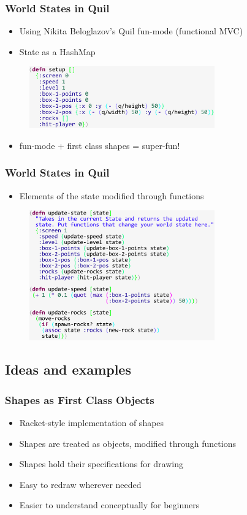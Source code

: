 \documentclass{beamer}
\begin{document}
\begin{frame}
\frametitle{World States in Quil}
	\begin{itemize}
		\item  Using Nikita Beloglazov's  Quil fun-mode (functional MVC)
		\item State as a HashMap
	\end{itemize}
	\begin{figure}
		\includegraphics[width=8cm]{PresentationImages/setupCode.pdf}
	\end{figure}
	\begin{itemize}
		\item fun-mode + first class shapes = super-fun!
	\end{itemize}
\end{frame}

\begin{frame}
\frametitle{World States in Quil}
\begin{itemize}
		\item Elements of the state modified through functions
	\end{itemize}
	\begin{figure}
		\includegraphics[width=8cm]{PresentationImages/updateCode.pdf}
	\end{figure}
\end{frame}


\subsection{Ideas and examples}


\begin{frame}
\frametitle{Shapes as First Class Objects}
	\begin{itemize}
		\item Racket-style implementation of shapes
		\item Shapes are treated as objects, modified through functions
		\item Shapes hold their specifications for drawing
		\item Easy to redraw wherever needed
		\item Easier to understand conceptually for beginners
	\end{itemize}
\end{frame}
\end{document}
